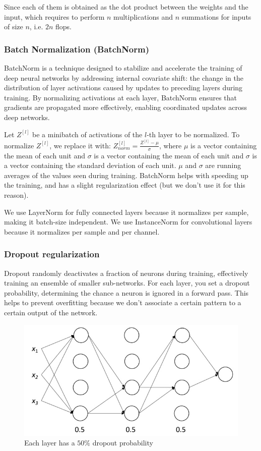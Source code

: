 \documentclass{article}
\begin{document}
Since each of them is obtained as the dot product between the weights and the input, which requires to perform $n$ multiplications and $n$ summations for inputs of size $n$, i.e. $2n$ flops.

\subsubsection{Batch Normalization (BatchNorm)}
BatchNorm is a technique designed to stabilize and accelerate the training of deep neural networks by addressing internal covariate shift: the change in the distribution of layer activations caused by updates to preceding layers during training.
By normalizing activations at each layer, BatchNorm ensures that gradients are propagated more effectively, enabling coordinated updates across deep networks.

Let $Z^{[l]}$ be a minibatch of activations of the $l$-th layer to be normalized.
To normalize $Z^{[l]}$, we replace it with: $Z^{[l]}_{norm} = \frac{Z^[l] - \mu}{\sigma}$, where $\mu$ is a vector containing the mean of each unit and $\sigma$ is a vector containing the mean of each unit and $\sigma$ is a vector containing the standard deviation of each unit.
$\mu$ and $\sigma$ are running averages of the values seen during training.
BatchNorm helps with speeding up the training, and has a slight regularization effect (but we don't use it for this reason).

We use LayerNorm for fully connected layers because it normalizes per sample, making it batch-size independent.
We use InstanceNorm for convolutional layers because it normalizes per sample and per channel.

\subsubsection{Dropout regularization}
Dropout randomly deactivates a fraction of neurons during training, effectively training an ensemble of smaller sub-networks.
For each layer, you set a dropout probability, determining the chance a neuron is ignored in a forward pass.
This helps to prevent overfitting because we don't associate a certain pattern to a certain output of the network.

\begin{figure}[htbp]
  \centering
  \includegraphics[width=0.8\linewidth]{./img/dropout.jpg}
  \caption{Each layer has a $50 \%$ dropout probability}
  \label{fig:dropout}
\end{figure}
\end{document}
